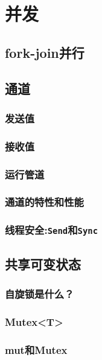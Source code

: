 \chapter{并发}\label{ch19}

\section{fork-join并行}

\section{通道}

\subsection{发送值}

\subsection{接收值}

\subsection{运行管道}

\subsection{通道的特性和性能}

\subsection{线程安全:\texttt{Send}和\texttt{Sync}}\label{threadsafe}

\section{共享可变状态}

\subsection{自旋锁是什么？}

\subsection{Mutex<T>}\label{mutex}

\subsection{mut和Mutex}

